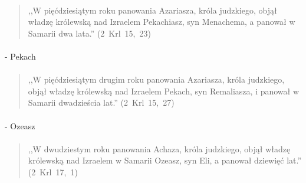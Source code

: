 \documentclass[10pt,a4paper,oneside]{article}
\begin{document}
\paragraph{}
\begin{quote}
,,W pięćdziesiątym roku panowania Azariasza, króla judzkiego, objął władzę królewską nad Izraelem Pekachiasz, syn Menachema, a panował w Samarii dwa lata.'' \mbox{(2 Krl 15, 23)}
\end{quote}
\paragraph{}
- Pekach
\paragraph{}
\begin{quote}
,,W pięćdziesiątym drugim roku panowania Azariasza, króla judzkiego, objął władzę królewską nad Izraelem Pekach, syn Remaliasza, i panował w Samarii dwadzieścia lat.'' \mbox{(2 Krl 15, 27)}
\end{quote}
\paragraph{}
- Ozeasz
\paragraph{}
\begin{quote}
,,W dwudziestym roku panowania Achaza, króla judzkiego, objął władzę królewską nad Izraelem w Samarii Ozeasz, syn Eli, a panował dziewięć lat.'' \mbox{(2 Krl 17, 1)}
\end{quote}
\end{document}

